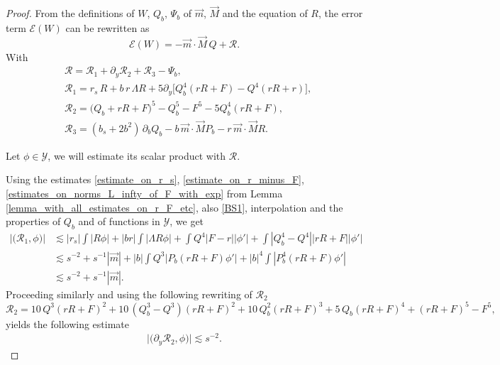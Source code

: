 \documentclass[16pt,english, oneside,reqno]{smfart}
\begin{document}
\begin{proof}
From the definitions of $W$, $Q_b$, $\Psi_b$ of $\vec{m}$, $\vec{M}$ and the equation of $R$, the error term $\mathcal{E}(W)$ can be rewritten as
\begin{equation}
    \mathcal{E}(W) = - \vec{m}\cdot\vec{M}\, Q+\mathcal{R}.
\end{equation}
With 
\begin{equation}
    \begin{split}
        &\mathcal{R} = \mathcal{R}_1 + \partial_y \mathcal{R}_2 + \mathcal{R}_3 - \Psi_b,\\
        &\mathcal{R}_1 = r_s \,R + b\,r\, \Lambda R + 5 \partial_y \big[ Q^4_b(rR+F)-Q^4(rR+r) \big],\\
        & \mathcal{R}_2 = \big( Q_b + rR + F \big)^5 - Q^5_b - F^5 - 5 Q^4_b (rR+F),\\
        &\mathcal{R}_3 = (b_s+2b^2)\,\partial_b Q_b - b\, \vec{m}\cdot \vec{M} P_b - r \,\vec{m}\cdot \vec{M}R.
    \end{split}
\end{equation}

Let $\phi \in \mathcal{Y}$, we will estimate its scalar product with $\mathcal{R}$.

Using the estimates \eqref{estimate_on_r_s}, \eqref{estimate_on_r_minus_F}, \eqref{estimates_on_norms_L_infty_of_F_with_exp} from Lemma \ref{lemma_with_all_estimates_on_r_F_etc}, also \eqref{BS1}, interpolation and the properties of $Q_b$ and of functions in $\mathcal{Y}$, we get
\begin{equation}
    \begin{split}
        \big\lvert \big(\mathcal{R}_1, \phi \big) \big\rvert  
        & \lesssim |r_s|\int |R \phi| + |br|\int|\Lambda R \phi| + \int Q^4 |F-r||\phi' | + \int |Q^4_b - Q^4| |rR+F||\phi'|\\
        & \lesssim s^{-2}+ s^{-1}|\vec{m}| + |b|\int Q^3|P_b(rR+F)\phi' | + |b|^4\int |P^4_b(rR+F)\phi'|\\
        & \lesssim s^{-2}+ s^{-1}|\vec{m}|.
    \end{split}
\end{equation}
Proceeding similarly and using the following rewriting of $\mathcal{R}_2$
\begin{equation}\label{estimate_R_2_in_proof_of_error_term}
    \mathcal{R}_2 = 10\,Q^3(rR+F)^2 + 10\,(Q^3_b - Q^3)(rR+F)^2 + 10\,Q^2_b(rR+F)^3+ 5\,Q_b (rR+F)^4 + (rR+F)^5 - F^5,
\end{equation}
yields the following estimate
\begin{equation}\label{estimate_1_in_proof_lemma_error_term}
\begin{split}
    \big\lvert \big(\partial_y \mathcal{R}_2, \phi \big) \big\rvert \lesssim  s^{-2}.
\end{split}
\end{equation}


\end{proof}
\end{document}
